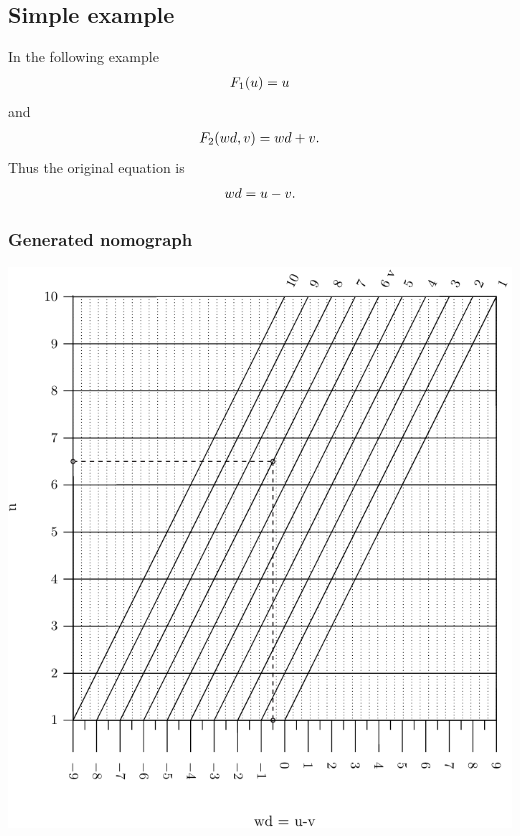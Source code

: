 \documentclass[a4paper,11pt,english]{sphinxmanual}
\begin{document}
\subsection{Simple example}
\label{types/types:id19}
In the following example
\begin{gather}
\begin{split}F_1(u)=u\end{split}\notag
\end{gather}
and
\begin{gather}
\begin{split}F_2(wd,v)=wd+v.\end{split}\notag
\end{gather}
Thus the original equation is
\begin{gather}
\begin{split}wd=u-v.\end{split}\notag
\end{gather}

\subsubsection{Generated nomograph}
\label{types/types:id20}
\includegraphics{ex_type5_nomo_1.pdf}
\end{document}
